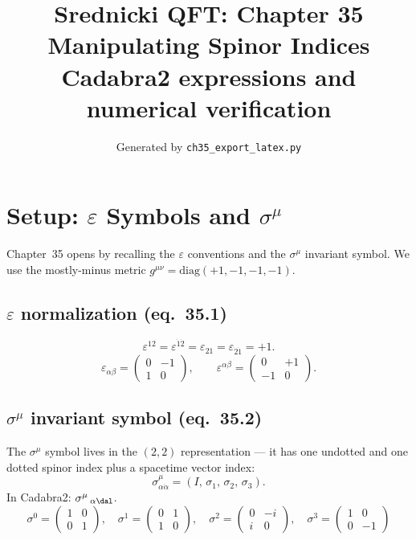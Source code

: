 \documentclass[12pt]{article}
\title{\textbf{Srednicki QFT: Chapter 35}\\[6pt]
       \large Manipulating Spinor Indices\\[4pt]
       \normalsize Cadabra2 expressions and numerical verification}
\author{Generated by \texttt{ch35\_export\_latex.py}}
\date{}
\begin{document}
\maketitle
\tableofcontents
\newpage

\section{Setup: \texorpdfstring{$\varepsilon$}{epsilon} Symbols
         and \texorpdfstring{$\sigma^\mu$}{sigma\^{}mu}}

Chapter~35 opens by recalling the $\varepsilon$ conventions and the
$\sigma^\mu$ invariant symbol.  We use the mostly-minus metric
$g^{\mu\nu} = \mathrm{diag}(+1,-1,-1,-1)$.

\subsection{\texorpdfstring{$\varepsilon$}{epsilon} normalization (eq.~35.1)}
\begin{equation}
  \varepsilon^{12} = \varepsilon^{\dot{1}\dot{2}}
  = \varepsilon_{21} = \varepsilon_{\dot{2}\dot{1}} = +1.
  \tag{35.1}
\end{equation}
\[
  \varepsilon_{\alpha\beta} = \begin{pmatrix}0 & -1\\1 & 0\end{pmatrix},\qquad
  \varepsilon^{\alpha\beta} = \begin{pmatrix}0 & +1\\-1 & 0\end{pmatrix}.
\]

\subsection{\texorpdfstring{$\sigma^\mu$}{sigma\^{}mu} invariant symbol (eq.~35.2)}

The $\sigma^\mu$ symbol lives in the $(2,2)$ representation --- it has
one undotted and one dotted spinor index plus a spacetime vector index:
\begin{equation}
  \sigma^\mu_{\alpha\dot{\alpha}} = (I,\,\sigma_1,\,\sigma_2,\,\sigma_3).
  \tag{35.2}
\end{equation}
In Cadabra2: $\sigma^{\mu}\,_{\alpha \dal}$.
\[
  \sigma^0 = \begin{pmatrix}1 & 0 \\ 0 & 1\end{pmatrix},\quad
  \sigma^1 = \begin{pmatrix}0 & 1 \\ 1 & 0\end{pmatrix},\quad
  \sigma^2 = \begin{pmatrix}0 & -i \\ i & 0\end{pmatrix},\quad
  \sigma^3 = \begin{pmatrix}1 & 0 \\ 0 & -1\end{pmatrix}
\]
\end{document}
